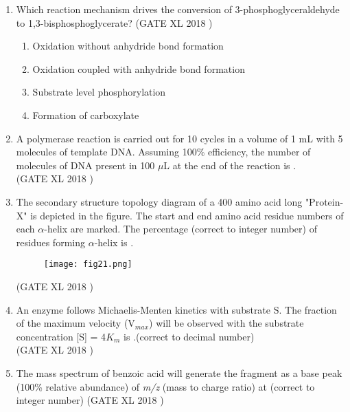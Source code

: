 \documentclass[14pt]{extarticle}
\begin{document}
\begin{flushleft}
\begin{enumerate}[leftmargin=*]
\item Which reaction mechanism drives the conversion of 3-phosphoglyceraldehyde to 1,3-bisphosphoglycerate?
\hfill(GATE XL 2018 )\\

\begin{enumerate}
    \item Oxidation without anhydride bond formation
    \item Oxidation coupled with anhydride bond formation
    \item Substrate level phosphorylation
    \item Formation of carboxylate
\end{enumerate}


\item A polymerase reaction is carried out for 10 cycles in a volume of 1 mL with 5 molecules of template DNA. Assuming 100\% efficiency, the number of molecules of DNA present in 100 $\mu$L at the end of the reaction is \underline{\hspace{2cm}}.\\
\hfill(GATE XL 2018 )

\item The secondary structure topology diagram of a 400 amino acid long "Protein-X" is depicted in the figure. The start and end amino acid residue numbers of each $\alpha$-helix are marked. The percentage (correct to integer number) of residues forming $\alpha$-helix is \underline{\hspace{2cm}}.
\begin{figure}[H]
    \centering
    \texttt{[image: fig21.png]}
    \caption{}
    \label{fig:q17}
\end{figure}

\hfill(GATE XL 2018 )


\item An enzyme follows Michaelis-Menten kinetics with substrate S. The fraction of the maximum velocity (V$_{max}$) will be observed with the substrate concentration [S] = 4$K_m$ is \underline{\hspace{2cm}}.(correct to decimal number)\\
\hfill(GATE XL 2018 )\\


\item The mass spectrum of benzoic acid will generate the fragment as a base peak (100\% relative abundance) of \textit{m/z} (mass to charge ratio) at \underline{\hspace{3cm}}
(correct to integer number)
\hfill(GATE XL 2018 )\\




\end{enumerate}
\end{flushleft}
\end{document}

